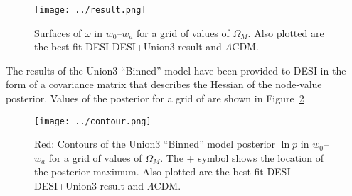 \documentclass[11pt, oneside]{article}   	%
\begin{document}
\begin{figure}[htbp] %
   \centering
   \texttt{[image: ../result.png]} 
   \caption{Surfaces of $\omega$  in $w_0$--$w_a$ for a grid of values of $\Omega_M$.  Also plotted are the best fit DESI DESI+Union3
   result and  $\Lambda$CDM.}
   \label{fig:priors}
\end{figure}

The results of the Union3 ``Binned'' model have been provided to DESI in the form of a covariance matrix that describes
the Hessian of the node-value posterior.   Values of the posterior for a grid of are shown in Figure~\ref{fig:posterior}
\begin{figure}[htbp] %
   \centering
   \texttt{[image: ../contour.png]} 
   \caption{Red: Contours of the Union3 ``Binned'' model  posterior  $\ln{p}$ 
   in $w_0$--$w_a$ for a grid of values of $\Omega_M$.  
   The $+$ symbol shows the location of the posterior maximum.  Also plotted are the best fit DESI DESI+Union3
   result and  $\Lambda$CDM.}
   \label{fig:posterior}
\end{figure}
\end{document}
